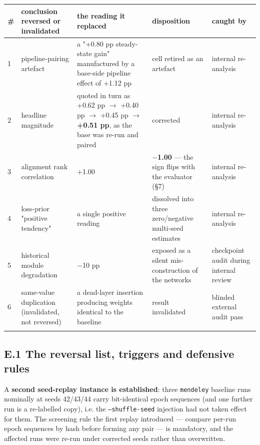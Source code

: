 \documentclass[pdflatex,sn-mathphys-ay]{sn-jnl}
\begin{document}
{\footnotesize
\setlength{\tabcolsep}{4pt}
\begin{longtable}{p{}p{}p{}p{}p{}}
\toprule
\# & conclusion reversed or invalidated & the reading it replaced & disposition & caught by \\
\midrule
\endhead
1 & pipeline-pairing artefact & a "+0.80 pp steady-state gain" manufactured by a base-side pipeline effect of +1.12 pp & cell retired as an artefact & internal re-analysis \\
2 & headline magnitude & quoted in turn as +0.62 pp \ensuremath{\rightarrow} +0.40 pp \ensuremath{\rightarrow} +0.45 pp \ensuremath{\rightarrow} \textbf{+0.51 pp}, as the base was re-run and paired & corrected & internal re-analysis \\
3 & alignment rank correlation & +1.00 & \textbf{\ensuremath{-}1.00} --- the sign flips with the evaluator (\S{}7) & internal re-analysis \\
4 & loss-prior "positive tendency" & a single positive reading & dissolved into three zero/negative multi-seed estimates & internal re-analysis \\
5 & historical module degradation & \ensuremath{-}10 pp & exposed as a silent mis-construction of the networks & checkpoint audit during internal review \\
6 & same-value duplication (invalidated, not reversed) & a dead-layer insertion producing weights identical to the baseline & result invalidated & blinded external audit pass \\
\botrule
\end{longtable}}

\subsection*{E.1 The reversal list, triggers and defensive rules}

A \textbf{second seed-replay instance is established}: three \texttt{mendeley} baseline runs nominally at seeds 42/43/44 carry bit-identical epoch sequences (and one further run is a re-labelled copy), i.e. the \texttt{--shuffle-seed} injection had not taken effect for them. The screening rule the first replay introduced --- compare per-run epoch sequences by hash before forming any pair --- is mandatory, and the affected runs were re-run under corrected seeds rather than overwritten.
\end{document}
